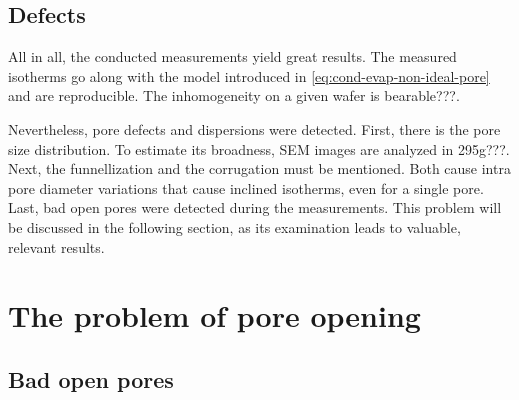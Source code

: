 \documentclass[../thesis.tex]{subfiles}
\begin{document}
    \subsection{Defects}
    \label{subsec:defects}

        All in all, the conducted measurements yield great results. The measured isotherms go along with the model introduced in \cref{eq:cond-evap-non-ideal-pore} and are reproducible. The inhomogeneity on a given wafer is bearable???.

        Nevertheless, pore defects and dispersions were detected. First, there is the pore size distribution. To estimate its broadness, SEM images are analyzed in 295g???. Next, the funnellization and the corrugation must be mentioned. Both cause intra pore diameter variations that cause inclined isotherms, even for a single pore. Last, bad open pores were detected during the measurements. This problem will be discussed in the following section, as its examination leads to valuable, relevant results.


  \section{The problem of pore opening}
  \label{sec:opening-problem}


      \subsection{Bad open pores}
      \label{subsec:bad-open-pores}

        
\end{document}
